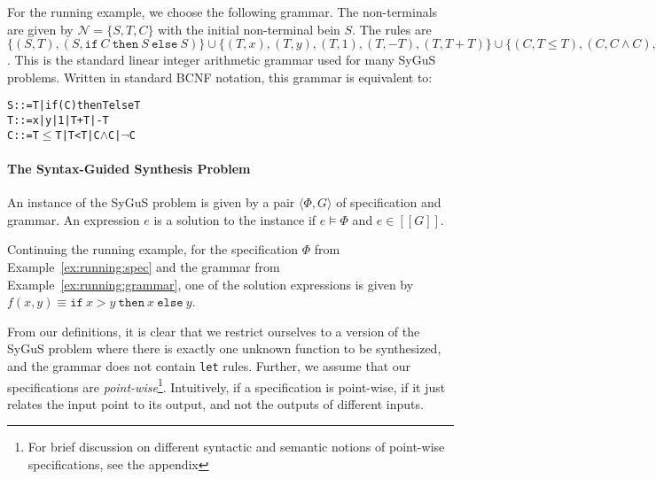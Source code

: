 \documentclass{llncs}
\newcommand\tuple[1]{\langle #1 \rangle}
\newcommand\Expr{e}
\newcommand\Spec{\Phi}
\newcommand\Grammar{G}
\newcommand\sem[1]{[\![ #1 ]\!]}
\newcommand\SynthFun{f}
\newcommand\NonTerminals{\mathcal{N}}
\newcommand\StartSymbol{S}
\begin{document}
\begin{example}
  \label{ex:running:grammar}
  For the running example, we choose the following grammar.
  The non-terminals are given by $\NonTerminals = \{ \StartSymbol, T, C \}$ with
  the initial non-terminal bein $\StartSymbol$.
  The rules are $\{ (\StartSymbol, T), (\StartSymbol,
        \mathtt{if}~C~\mathtt{then}~\StartSymbol~\mathtt{else}~\StartSymbol)
        \} \cup \{ (T, x), (T, y), (T, 1), (T, - T), (T, T + T) \} \cup
        \{ (C, T \leq T), (C, C \wedge C), (C, \neg C) \}$.
  This is the standard linear integer arithmetic grammar used for many
  SyGuS problems.
  Written in standard BCNF notation, this grammar is equivalent to:
    \vspace{-1ex}
  \begin{alltt}
    S ::= T | if (C) then T else T
    T ::= x | y | 1 | T + T | - T
    C ::= T \(\leq\) T | T < T | C \(\wedge\) C | \(\neg\) C
  \end{alltt}
    \vspace{-4ex}
\end{example}

\paragraph{The Syntax-Guided Synthesis Problem}
An instance of the SyGuS problem is given by a pair $\tuple { \Spec,
\Grammar }$ of specification and grammar.
An expression $\Expr$ is a solution to the instance if $\Expr \models
\Spec$ and $\Expr \in \sem{\Grammar}$.

\begin{example}
  Continuing the running example, for the specification $\Spec$ from
  Example~\ref{ex:running:spec} and the grammar from
  Example~\ref{ex:running:grammar}, one of the solution expressions is
  given by $\SynthFun(x, y) \equiv \mathtt{if}~x > y~\mathtt{then}~x~\mathtt{else}~y$.
\end{example}

From our definitions, it is clear that we restrict ourselves to a
version of the SyGuS problem where there is exactly one unknown function
to be synthesized, and the grammar does not contain {\tt let} rules.
Further, we assume that our specifications are {\em
  point-wise}\footnote{For brief discussion on different syntactic and
semantic notions of point-wise specifications, see the appendix}.
Intuitively, if a specification is point-wise, if it just relates the
input point to its output, and not the outputs of different inputs.
\end{document}
